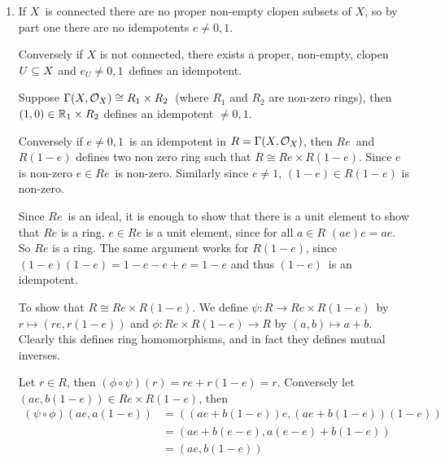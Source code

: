 \documentclass[a4paper,11pt,english]{article}
\begin{document}
\begin{exercise}[2]
\begin{enumerate}
\item 
If $X$ is connected there are no proper non-empty clopen subsets of $X$, so by
part one there are no idempotents $e\ne 0,1$. 

Conversely if $X$ is not connected, there exists a proper, non-empty, clopen
$U \subseteq X$ and $e_U \ne 0,1$ defines an idempotent.

Suppose $\Gamma(X, \mathcal{O}_X) \cong R_1 \times R_2$ (where $R_1$ and $R_2$ are
non-zero rings), then $(1,0) \in \mathbb{R}_1 \times R_2$ defines an idempotent $\ne
0,1$.

Conversely if $e \ne 0,1$ is an idempotent in $R = \Gamma(X,\mathcal{O}_X)$, then 
$Re$ and $R(1-e)$ defines two non zero ring such that $R \cong Re \times
R(1-e)$. Since $e$ is non-zero $e \in Re$ is non-zero. Similarly since $e \ne
1$, $(1-e) \in R(1-e)$ is non-zero.

Since $Re$ is an ideal, it is enough to show that there is a unit element to
show that $Re$ is a ring. $e \in Re$ is a unit element, since for all $a \in R$ 
$(ae)e = ae$. So $Re$ is a ring. The same argument works for $R(1-e)$, since
$(1-e)(1-e) = 1 - e - e + e = 1-e$ and thus $(1-e)$ is an idempotent.

To show that $R \cong Re \times R(1-e)$. We define $\psi: R \to Re \times
R(1-e)$ by $r \mapsto (re, r(1-e))$ and $\phi: Re \times R(1-e)\to R$ by 
$(a,b) \mapsto a+b$. Clearly this defines ring homomorphisms, and in fact they
defines mutual inverses.

Let $r \in R$, then $(\phi \circ \psi)(r) = re + r(1-e) = r$. Conversely let
$(ae,b(1-e)) \in Re\times R(1-e)$, then 
\begin{align*}
(\psi \circ \phi)(ae,a(1-e)) &= \left((ae + b(1-e))e, (ae+b(1-e)) (1-e)\right)
\\
&= \left( ae + b(e-e), a(e-e) + b(1-e) \right ) \\
&= \left(ae,b(1-e)\right) 
\end{align*}
\end{enumerate}
\end{exercise}
\end{document}
